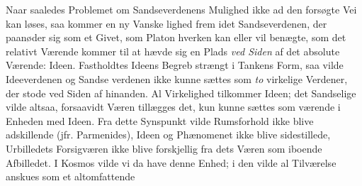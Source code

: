 \documentclass[12pt,a4paper]{book}
\newcommand{\gk}[1]{\textit{#1}}
\begin{document}
Naar saaledes Problemet om Sandseverdenens Mulighed
ikke ad den forsøgte Vei kan løses, saa kommer en ny Vanske\-%
lighed frem idet Sandseverdenen, der paanøder sig som et
Givet, som Platon hverken kan eller vil benægte, som det
relativt Værende kommer til at hævde sig en Plads \emph{ved Siden}
af det absolute Værende: Ideen. Fastholdtes Ideens Begreb
strængt i Tankens Form, saa vilde Ideeverdenen og Sandse\-%
verdenen ikke kunne sættes som \emph{to} virkelige Verdener, der
stode ved Siden af hinanden. Al Virkelighed tilkommer Ideen;
det Sandselige vilde altsaa, forsaavidt Væren tillægges det,
kun kunne sættes som værende i Enheden med Ideen. Fra
dette Synspunkt vilde Rumsforhold ikke blive adskillende (jfr.
Parmenides), Ideen og Phænomenet ikke blive sidestillede,
Urbilledets Forsigværen ikke blive forskjellig fra dets Væren
som iboende Afbilledet. I Kosmos vilde vi da have denne
Enhed; i den vilde al Tilværelse anskues som et altomfattende
\end{document}
